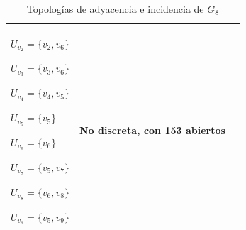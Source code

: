 \begin{table}[p]
\begin{tabular}{@{}>{\centering\arraybackslash}m{}>{\centering\arraybackslash}m{}>{\centering\arraybackslash}m{}@{}}
         ${U_{v_2}=\{v_2,v_6\}}$\par
         ${U_{v_3}=\{v_3,v_6\}}$\par
         ${U_{v_4}=\{v_4,v_5\}}$\par
         ${U_{v_5}=\{v_5\}}$\par
         ${U_{v_6}=\{v_6\}}$\par
         ${U_{v_7}=\{v_5,v_7\}}$\par
         ${U_{v_8}=\{v_6,v_8\}}$\par
         ${U_{v_9}=\{v_5,v_9\}}$
      &
         No discreta, con 153 abiertos \\[6pt]
      \hline
   \end{tabular}
   \caption{Topologías de adyacencia e incidencia de $G_8$}
   \label{tab:topologias_G_8}
\end{table}
